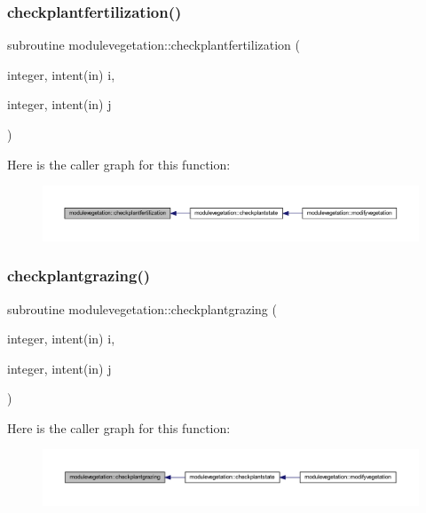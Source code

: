 \subsubsection{\texorpdfstring{checkplantfertilization()}{checkplantfertilization()}}
{\footnotesize\ttfamily subroutine modulevegetation\+::checkplantfertilization (\begin{DoxyParamCaption}\item[{integer, intent(in)}]{i,  }\item[{integer, intent(in)}]{j }\end{DoxyParamCaption})\hspace{0.3cm}{\ttfamily [private]}}

Here is the caller graph for this function\+:\nopagebreak
\begin{figure}[H]
\begin{center}
\leavevmode
\includegraphics[width=350pt]{namespacemodulevegetation_afa2f07d94b35869067e9a8e4533df2fa_icgraph}
\end{center}
\end{figure}
\mbox{\label{namespacemodulevegetation_a4db38a1c2ca800ff349c72b3c0c01ce7}} 
\subsubsection{\texorpdfstring{checkplantgrazing()}{checkplantgrazing()}}
{\footnotesize\ttfamily subroutine modulevegetation\+::checkplantgrazing (\begin{DoxyParamCaption}\item[{integer, intent(in)}]{i,  }\item[{integer, intent(in)}]{j }\end{DoxyParamCaption})\hspace{0.3cm}{\ttfamily [private]}}

Here is the caller graph for this function\+:\nopagebreak
\begin{figure}[H]
\begin{center}
\leavevmode
\includegraphics[width=350pt]{namespacemodulevegetation_a4db38a1c2ca800ff349c72b3c0c01ce7_icgraph}
\end{center}
\end{figure}
\mbox{\label{namespacemodulevegetation_a2d8935c5541507a64b862765b5c7702c}} 
